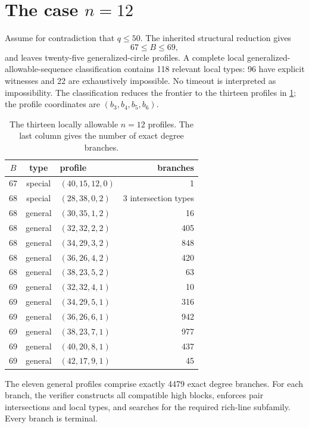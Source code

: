 \section{The case $n=12$}

Assume for contradiction that $q\le50$.  The inherited structural reduction gives
\[
 67\le B\le69,
\]
and leaves twenty-five generalized-circle profiles.  A complete local generalized-allowable-sequence classification contains 118 relevant local types: 96 have explicit witnesses and 22 are exhaustively impossible.  No timeout is interpreted as impossibility.  The classification reduces the frontier to the thirteen profiles in \cref{tab:n12profiles}; the profile coordinates are $(b_3,b_4,b_5,b_6)$.

\begin{table}[ht]
\centering
\caption{The thirteen locally allowable $n=12$ profiles.  The last column gives the number of exact degree branches.}
\label{tab:n12profiles}
\begin{tabular}{ccl r}
\toprule
$B$ & type & profile & branches \\
\midrule
67 & special & $(40,15,12,0)$ & 1 \\
68 & special & $(28,38,0,2)$ & 3 intersection types \\
68 & general & $(30,35,1,2)$ & 16 \\
68 & general & $(32,32,2,2)$ & 405 \\
68 & general & $(34,29,3,2)$ & 848 \\
68 & general & $(36,26,4,2)$ & 420 \\
68 & general & $(38,23,5,2)$ & 63 \\
69 & general & $(32,32,4,1)$ & 10 \\
69 & general & $(34,29,5,1)$ & 316 \\
69 & general & $(36,26,6,1)$ & 942 \\
69 & general & $(38,23,7,1)$ & 977 \\
69 & general & $(40,20,8,1)$ & 437 \\
69 & general & $(42,17,9,1)$ & 45 \\
\bottomrule
\end{tabular}
\end{table}

The eleven general profiles comprise exactly 4479 exact degree branches.  For each branch, the verifier constructs all compatible high blocks, enforces pair intersections and local types, and searches for the required rich-line subfamily.  Every branch is terminal.

